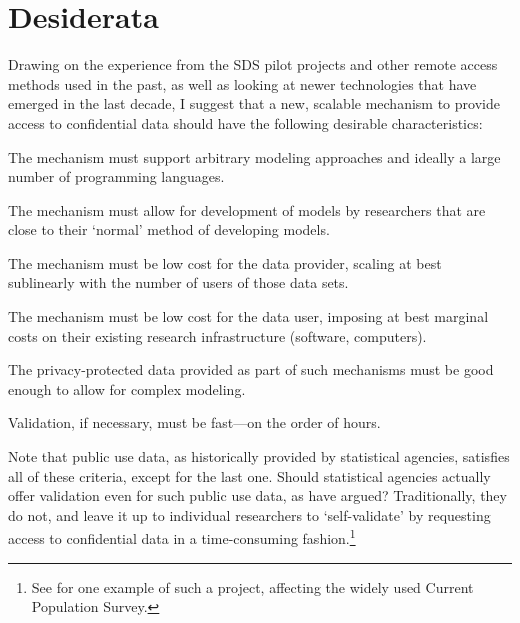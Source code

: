 \documentclass[inline]{hdsr}
\begin{document}
\section{Desiderata}
\label{sec:desiderata}

Drawing on the experience from the SDS pilot projects and other remote access methods used in the past, as well as looking at newer technologies that have emerged in the last decade, I suggest that a new, scalable mechanism to provide access to confidential data should have the following desirable characteristics:

\begin{enumerate}[label={[D\arabic*]}]
    \item The mechanism must support arbitrary modeling approaches and ideally a large number of programming languages.
    \item The mechanism must allow for development of models by researchers that are close to their `normal' method of developing models.
    \item The mechanism must be low cost for the data provider, scaling at best sublinearly with the number of users of those data sets.
    \item The mechanism must be low cost for the data user, imposing at best marginal costs on their existing research infrastructure (software, computers).
    \item The privacy-protected data provided as part of such mechanisms must be good enough to allow for complex modeling.
    \item Validation, if necessary, must be fast---on the order of hours.
\end{enumerate}

Note that public use data, as historically provided by statistical agencies, satisfies all of these criteria, except for the last one. Should statistical agencies actually offer validation even for such public use data, as \citet{reiter_verification_2009} have argued? Traditionally, they do not, and leave it up to individual researchers to `self-validate' by requesting access to confidential data in a time-consuming fashion.\footnote{See \citet{armour_using_2016} for one example of such a project, affecting the widely used Current Population Survey.}
\end{document}
